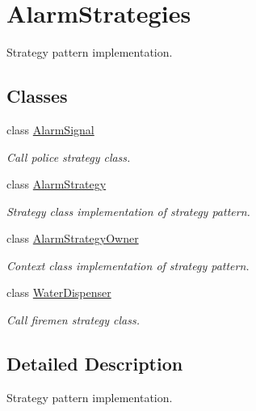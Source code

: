 \hypertarget{group__AlarmStrategies}{}\section{Alarm\+Strategies}
\label{group__AlarmStrategies}


Strategy pattern implementation.  


\subsection*{Classes}
\begin{DoxyCompactItemize}
\item 
class \hyperlink{classAlarmSignal}{Alarm\+Signal}
\begin{DoxyCompactList}\small\item\em Call police strategy class. \end{DoxyCompactList}\item 
class \hyperlink{classAlarmStrategy}{Alarm\+Strategy}
\begin{DoxyCompactList}\small\item\em Strategy class implementation of strategy pattern. \end{DoxyCompactList}\item 
class \hyperlink{classAlarmStrategyOwner}{Alarm\+Strategy\+Owner}
\begin{DoxyCompactList}\small\item\em Context class implementation of strategy pattern. \end{DoxyCompactList}\item 
class \hyperlink{classWaterDispenser}{Water\+Dispenser}
\begin{DoxyCompactList}\small\item\em Call firemen strategy class. \end{DoxyCompactList}\end{DoxyCompactItemize}


\subsection{Detailed Description}
Strategy pattern implementation. 

